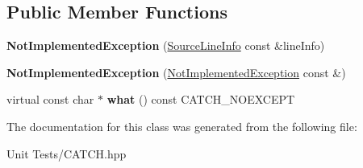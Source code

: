 \subsection*{Public Member Functions}
\begin{DoxyCompactItemize}
\item 
{\bfseries Not\+Implemented\+Exception} (\hyperlink{structCatch_1_1SourceLineInfo}{Source\+Line\+Info} const \&line\+Info)\hypertarget{classCatch_1_1NotImplementedException_ab4f0a5c39d8ffb72c664e2c07e180634}{}\label{classCatch_1_1NotImplementedException_ab4f0a5c39d8ffb72c664e2c07e180634}

\item 
{\bfseries Not\+Implemented\+Exception} (\hyperlink{classCatch_1_1NotImplementedException}{Not\+Implemented\+Exception} const \&)\hypertarget{classCatch_1_1NotImplementedException_a508a7a833455da2d3c10ea1a9d45e982}{}\label{classCatch_1_1NotImplementedException_a508a7a833455da2d3c10ea1a9d45e982}

\item 
virtual const char $\ast$ {\bfseries what} () const C\+A\+T\+C\+H\+\_\+\+N\+O\+E\+X\+C\+E\+PT\hypertarget{classCatch_1_1NotImplementedException_ad4c13963f1a8feacda0cd331adda89e3}{}\label{classCatch_1_1NotImplementedException_ad4c13963f1a8feacda0cd331adda89e3}

\end{DoxyCompactItemize}


The documentation for this class was generated from the following file\+:\begin{DoxyCompactItemize}
\item 
Unit Tests/C\+A\+T\+C\+H.\+hpp\end{DoxyCompactItemize}
